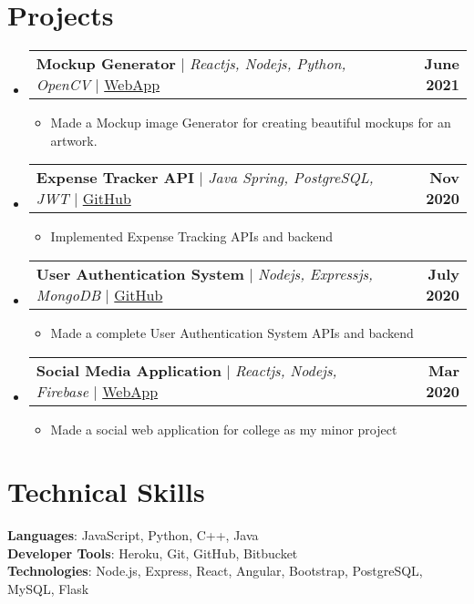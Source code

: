 \documentclass[letterpaper,11pt]{article}
\makeatletter
\newcommand{\resumeItem}[1]{
  \item\small{
    {#1 \vspace{-2pt}}
  }
}
\newcommand{\resumeProjectHeading}[2]{
    \item
    \begin{tabular*}{1.001\textwidth}{l@{\extracolsep{\fill}}r}
      \small#1 & \textbf{\small #2} \\
    \end{tabular*}\vspace{-7pt}
}
\newcommand{\resumeSubHeadingListStart}{\begin{itemize}[leftmargin=0.0in, label={}]}
\newcommand{\resumeSubHeadingListEnd}{\end{itemize}}
\newcommand{\resumeItemListStart}{\justify \begin{itemize}}
\newcommand{\resumeItemListEnd}{\end{itemize}\vspace{-5pt}}
\makeatother
\begin{document}
\section{Projects}
    \vspace{-5pt}
    \resumeSubHeadingListStart
        \resumeProjectHeading
            {\textbf{Mockup Generator} $|$ \emph{Reactjs, Nodejs, Python, OpenCV}  $|$ \href{http://mockupgenerator-12159.web.app}{WebApp}}{June 2021}
            \resumeItemListStart
                \resumeItem{Made a Mockup image Generator for creating beautiful mockups for an artwork.}
            \resumeItemListEnd
        \resumeProjectHeading
            {\textbf{Expense Tracker API} $|$ \emph{Java Spring, PostgreSQL, JWT} $|$ \href{https://github.com/owais1412/expense-tracker-api}{GitHub}}{Nov 2020}
            \resumeItemListStart
                \resumeItem{Implemented Expense Tracking APIs and backend}
            \resumeItemListEnd
        \resumeProjectHeading
            {\textbf{User Authentication System} $|$ \emph{Nodejs, Expressjs, MongoDB} $|$ \href{https://github.com/owais1412/Node-User-Auth}{GitHub}}{July 2020}
            \resumeItemListStart
                \resumeItem{Made a complete User Authentication System APIs and backend}
            \resumeItemListEnd
        \resumeProjectHeading
            {\textbf{Social Media Application} $|$ \emph{Reactjs, Nodejs, Firebase} $|$ \href{https://svcesocialspace.web.app/login}{WebApp}}{Mar 2020}
            \resumeItemListStart
                \resumeItem{Made a social web application for college as my minor project}
            \resumeItemListEnd
    \resumeSubHeadingListEnd


%
\section{Technical Skills}
 \begin{itemize}[leftmargin=0.15in, label={}]
    {\item{
     \textbf{Languages}{: JavaScript, Python, C++, Java} \\
     \vspace{1pt}
     \textbf{Developer Tools}{: Heroku, Git, GitHub, Bitbucket} \\
     \vspace{1pt}
     \textbf{Technologies}{: Node.js, Express, React, Angular, Bootstrap, PostgreSQL, MySQL, Flask} \\
    }}
 \end{itemize}
 \vspace{-16pt}
\end{document}
